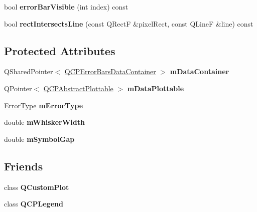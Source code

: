 \begin{DoxyCompactItemize}
\item 
bool {\bfseries error\+Bar\+Visible} (int index) const \hypertarget{class_q_c_p_error_bars_ae654c5016cebd994b104684578358afe}{}\label{class_q_c_p_error_bars_ae654c5016cebd994b104684578358afe}

\item 
bool {\bfseries rect\+Intersects\+Line} (const Q\+RectF \&pixel\+Rect, const Q\+LineF \&line) const \hypertarget{class_q_c_p_error_bars_a4c2f5cf2afe52b702c07c977758b29dd}{}\label{class_q_c_p_error_bars_a4c2f5cf2afe52b702c07c977758b29dd}

\end{DoxyCompactItemize}
\subsection*{Protected Attributes}
\begin{DoxyCompactItemize}
\item 
Q\+Shared\+Pointer$<$ \hyperlink{class_q_vector}{Q\+C\+P\+Error\+Bars\+Data\+Container} $>$ {\bfseries m\+Data\+Container}\hypertarget{class_q_c_p_error_bars_a20c4496f47655b3beb889fe2ca9f8622}{}\label{class_q_c_p_error_bars_a20c4496f47655b3beb889fe2ca9f8622}

\item 
Q\+Pointer$<$ \hyperlink{class_q_c_p_abstract_plottable}{Q\+C\+P\+Abstract\+Plottable} $>$ {\bfseries m\+Data\+Plottable}\hypertarget{class_q_c_p_error_bars_ad2a0e62d353d64a3dc0bce1a1a3394a9}{}\label{class_q_c_p_error_bars_ad2a0e62d353d64a3dc0bce1a1a3394a9}

\item 
\hyperlink{class_q_c_p_error_bars_a95f0220f11a72648b96480a85ce26474}{Error\+Type} {\bfseries m\+Error\+Type}\hypertarget{class_q_c_p_error_bars_af9fd3117b86aac728c9e8e87c406ed9a}{}\label{class_q_c_p_error_bars_af9fd3117b86aac728c9e8e87c406ed9a}

\item 
double {\bfseries m\+Whisker\+Width}\hypertarget{class_q_c_p_error_bars_a3873724f7ac3392bdf9d46a47076a1d2}{}\label{class_q_c_p_error_bars_a3873724f7ac3392bdf9d46a47076a1d2}

\item 
double {\bfseries m\+Symbol\+Gap}\hypertarget{class_q_c_p_error_bars_a5cb5628b75e5aff0875710705666ec57}{}\label{class_q_c_p_error_bars_a5cb5628b75e5aff0875710705666ec57}

\end{DoxyCompactItemize}
\subsection*{Friends}
\begin{DoxyCompactItemize}
\item 
class {\bfseries Q\+Custom\+Plot}\hypertarget{class_q_c_p_error_bars_a00f8b42d059625f815808a7cc99c2f04}{}\label{class_q_c_p_error_bars_a00f8b42d059625f815808a7cc99c2f04}

\item 
class {\bfseries Q\+C\+P\+Legend}\hypertarget{class_q_c_p_error_bars_a6dddb88f268bc26693c552bbb68acbb5}{}\label{class_q_c_p_error_bars_a6dddb88f268bc26693c552bbb68acbb5}

\end{DoxyCompactItemize}
